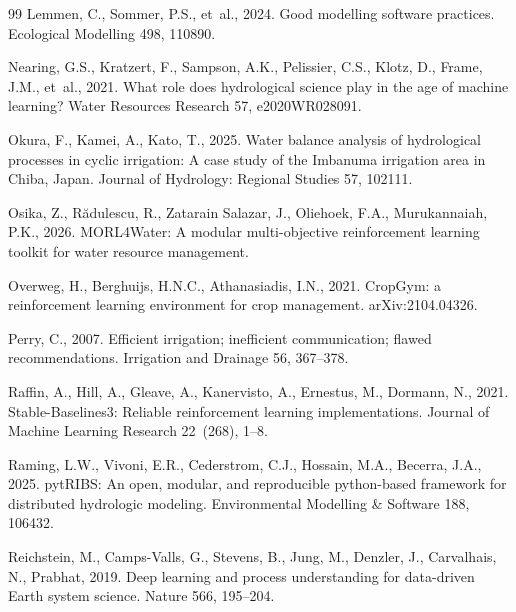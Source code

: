\documentclass[preprint,12pt,authoryear,review]{elsarticle}
\begin{document}
\begin{thebibliography}{99}
Lemmen, C., Sommer, P.S., et~al., 2024. Good modelling software practices. Ecological Modelling 498, 110890. 

Nearing, G.S., Kratzert, F., Sampson, A.K., Pelissier, C.S., Klotz, D., Frame, J.M., et~al., 2021. What role does hydrological science play in the age of machine learning? Water Resources Research 57, e2020WR028091. 

Okura, F., Kamei, A., Kato, T., 2025. Water balance analysis of hydrological processes in cyclic irrigation: A case study of the Imbanuma irrigation area in Chiba, Japan. Journal of Hydrology: Regional Studies 57, 102111. 

Osika, Z., R\u{a}dulescu, R., Zatarain Salazar, J., Oliehoek, F.A., Murukannaiah, P.K., 2026. MORL4Water: A modular multi-objective reinforcement learning toolkit for water resource management. 

Overweg, H., Berghuijs, H.N.C., Athanasiadis, I.N., 2021. CropGym: a reinforcement learning environment for crop management. arXiv:2104.04326.

Perry, C., 2007. Efficient irrigation; inefficient communication; flawed recommendations. Irrigation and Drainage 56, 367--378. 

Raffin, A., Hill, A., Gleave, A., Kanervisto, A., Ernestus, M., Dormann, N., 2021. Stable-Baselines3: Reliable reinforcement learning implementations. Journal of Machine Learning Research 22~(268), 1--8.

Raming, L.W., Vivoni, E.R., Cederstrom, C.J., Hossain, M.A., Becerra, J.A., 2025. pytRIBS: An open, modular, and reproducible python-based framework for distributed hydrologic modeling. Environmental Modelling \& Software 188, 106432. 

Reichstein, M., Camps-Valls, G., Stevens, B., Jung, M., Denzler, J., Carvalhais, N., Prabhat, 2019. Deep learning and process understanding for data-driven Earth system science. Nature 566, 195--204. 


\end{thebibliography}
\end{document}
